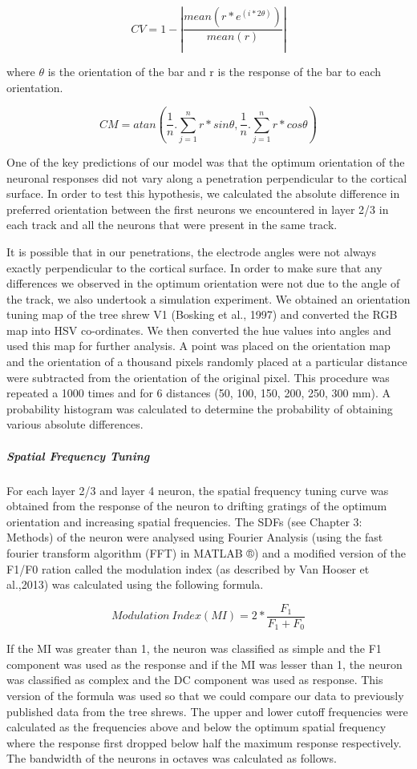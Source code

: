 \[CV = 1 - |\frac{mean(r*e^{(i*2\theta)})}{mean(r)}|\]

where \(\theta\) is the orientation of the bar and r is the response of
the bar to each orientation.

\[CM = atan(\frac{1}{n}.\sum_{j = 1}^{n}r*sin\theta,\frac{1}{n}.\sum_{j = 1}^{n}r*cos\theta)\]

One of the key predictions of our model was that the optimum orientation
of the neuronal responses did not vary along a penetration perpendicular
to the cortical surface. In order to test this hypothesis, we calculated
the absolute difference in preferred orientation between the first
neurons we encountered in layer 2/3 in each track and all the neurons
that were present in the same track.

It is possible that in our penetrations, the electrode angles were not
always exactly perpendicular to the cortical surface. In order to make
sure that any differences we observed in the optimum orientation were
not due to the angle of the track, we also undertook a simulation
experiment. We obtained an orientation tuning map of the tree shrew V1
(Bosking et al., 1997) and converted the RGB map into HSV co-ordinates.
We then converted the hue values into angles and used this map for
further analysis. A point was placed on the orientation map and the
orientation of a thousand pixels randomly placed at a particular
distance were subtracted from the orientation of the original pixel.
This procedure was repeated a 1000 times and for 6 distances (50, 100,
150, 200, 250, 300 mm). A probability histogram was calculated to
determine the probability of obtaining various absolute differences.


\subparagraph{Spatial Frequency Tuning}

For each layer 2/3 and layer 4 neuron, the spatial frequency tuning
curve was obtained from the response of the neuron to drifting gratings
of the optimum orientation and increasing spatial frequencies. The SDFs
(see Chapter 3: Methods) of the neuron were analysed using Fourier
Analysis (using the fast fourier transform algorithm (FFT) in MATLAB ®)
and a modified version of the F1/F0 ration called the modulation index
(as described by Van Hooser et al.,2013) was calculated using the
following formula.

\[Modulation\ Index(MI) = 2*\frac{F_{1}}{F_{1} + F_{0}}\]

If the MI was greater than 1, the neuron was classified as simple and
the F1 component was used as the response and if the MI was lesser than
1, the neuron was classified as complex and the DC component was used as
response. This version of the formula was used so that we could compare
our data to previously published data from the tree shrews. The upper
and lower cutoff frequencies were calculated as the frequencies above
and below the optimum spatial frequency where the response first dropped
below half the maximum response respectively. The bandwidth of the
neurons in octaves was calculated as follows.

